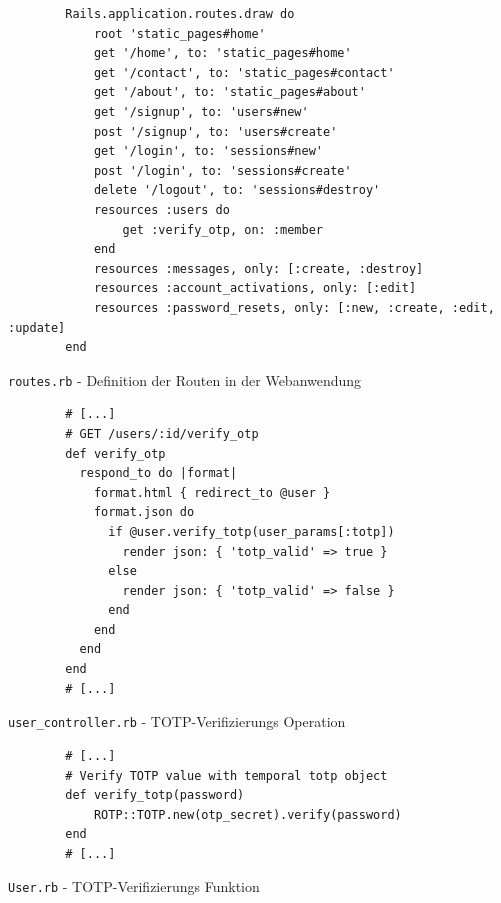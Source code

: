 \documentclass[11pt,a4paper,ngerman]{scrreprt}
\begin{document}
\begin{listing}[htpb]
    \begin{verbatim}
        Rails.application.routes.draw do
            root 'static_pages#home'
            get '/home', to: 'static_pages#home'
            get '/contact', to: 'static_pages#contact'
            get '/about', to: 'static_pages#about'
            get '/signup', to: 'users#new'
            post '/signup', to: 'users#create'
            get '/login', to: 'sessions#new'
            post '/login', to: 'sessions#create'
            delete '/logout', to: 'sessions#destroy'
            resources :users do
                get :verify_otp, on: :member
            end
            resources :messages, only: [:create, :destroy]
            resources :account_activations, only: [:edit]
            resources :password_resets, only: [:new, :create, :edit, :update]
        end
    \end{verbatim}
    \caption{\texttt{routes.rb} - Definition der Routen in der Webanwendung}
    \label{lst:routes.rb}
\end{listing}

\begin{listing}[htpb]
    \begin{verbatim}
        # [...]
        # GET /users/:id/verify_otp
        def verify_otp
          respond_to do |format|
            format.html { redirect_to @user }
            format.json do
              if @user.verify_totp(user_params[:totp])
                render json: { 'totp_valid' => true }
              else
                render json: { 'totp_valid' => false }
              end
            end
          end
        end
        # [...]
    \end{verbatim}
    \caption{\texttt{user\_controller.rb} - TOTP-Verifizierungs Operation}
    \label{lst:user-controller.rb-verify-otp}
\end{listing}

\begin{listing}[htpb]
    \begin{verbatim}
        # [...]
        # Verify TOTP value with temporal totp object
        def verify_totp(password)
            ROTP::TOTP.new(otp_secret).verify(password)
        end
        # [...]
    \end{verbatim}
    \caption{\texttt{User.rb} - TOTP-Verifizierungs Funktion}
    \label{lst:user.rb-verify-otp}
\end{listing}
\clearpage
\end{document}

